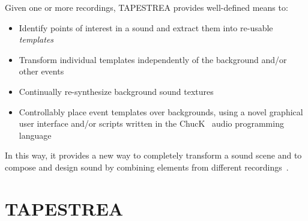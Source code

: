 \documentclass{sig-alt-release2}
\begin{document}
Given one or more recordings, TAPESTREA provides well-defined means to: 
\begin{itemize}
\setlength\itemsep{-3pt}
\item Identify points of interest in a sound and extract them into re-usable \textit{templates}
\item Transform individual templates independently of the background and/or other events
\item Continually re-synthesize background sound textures
\item Controllably place event templates over backgrounds, using a novel graphical user interface and/or scripts written in the ChucK~\cite{Wang03} audio programming language
\end{itemize}
In this way, it provides a new way to completely transform a sound scene and to compose and design sound by combining elements from different recordings~\cite{Misra06c}.

\section{TAPESTREA}
\end{document}
